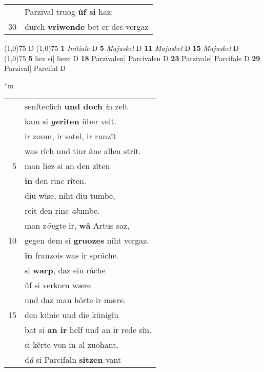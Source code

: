 \documentclass[8pt,a4paper,notitlepage]{article}
\begin{document}
\begin{table}[ht]
\begin{minipage}[t]{0.5\linewidth}
\begin{tabular}{rl}
 & Parzival truog \textbf{ûf si} haz;\\ 
30 & durch \textbf{vriwende} bet er des vergaz\\ 
\end{tabular}
\scriptsize
\line(1,0){75} \newline
D \newline
\line(1,0){75} \newline
\textbf{1} \textit{Initiale} D  \textbf{5} \textit{Majuskel} D  \textbf{11} \textit{Majuskel} D  \textbf{15} \textit{Majuskel} D  \newline
\line(1,0){75} \newline
\textbf{5} liez si] lieze D \textbf{18} Parzivalen] Parcivalen D \textbf{23} Parzivale] Parcifale D \textbf{29} Parzival] Parcifal D \newline
\end{minipage}
\hspace{0.5cm}
\begin{minipage}[t]{0.5\linewidth}
\small
\begin{center}*m
\end{center}
\begin{tabular}{rl}
 & senfteclîch \textbf{und doch} \textit{i}n zelt\\ 
 & kam si \textbf{\textit{ge}riten} über velt.\\ 
 & ir zoum, ir satel, ir runzît\\ 
 & was rîch und tiur âne allen strît.\\ 
5 & man liez si an den zîten\\ 
 & \textbf{in} den rinc rîten.\\ 
 & diu wîse, niht diu tumbe,\\ 
 & reit den rinc \textit{al}umbe.\\ 
 & man z\textit{öu}gte ir, \textbf{wâ} Artus saz,\\ 
10 & gegen dem si \textbf{gruozes} niht vergaz.\\ 
 & \textbf{in} franzois was ir sprâche.\\ 
 & si \textbf{warp}, daz ein râche\\ 
 & ûf si verkorn wære\\ 
 & und daz man hôrte ir mære.\\ 
15 & den künic und die künigîn\\ 
 & bat si \textbf{an ir} helf und an ir rede sîn.\\ 
 & si kêrte von in al zuohant,\\ 
 & d\textit{â} si Parcifaln \textbf{sitzen} vant\\ 

\end{tabular}
\end{minipage}
\end{table}
\end{document}
